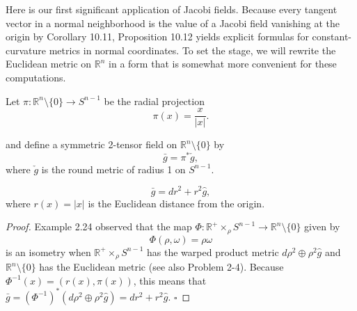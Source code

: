 Here is our first significant application of Jacobi fields. Because every tangent vector in a normal neighborhood is the value of a Jacobi field vanishing at the origin by Corollary 10.11, Proposition 10.12 yields explicit formulas for constant-curvature metrics in normal coordinates. To set the stage, we will rewrite the Euclidean metric on $\mathbb{R}^n$ in a form that is somewhat more convenient for these computations.

Let $\pi : \mathbb{R}^n \setminus \{0\} \to S^{n-1}$ be the radial projection
\begin{equation}
\pi(x) = \frac{x}{|x|}.
\tag{10.13}
\end{equation}

and define a symmetric 2-tensor field on $\mathbb{R}^n \setminus \{0\}$ by
\[
\bar{g} = \pi^* \check{g},
\]
where $\check{g}$ is the round metric of radius 1 on $S^{n-1}$.

\begin{lemma}\label{lem:metric-relation-euclidean}
\[
\bar{g} = dr^2 + r^2 \hat{g},
\]
where $r(x) = |x|$ is the Euclidean distance from the origin.

\begin{proof}
Example 2.24 observed that the map $\Phi : \mathbb{R}^+ \times_\rho S^{n-1} \to \mathbb{R}^n \setminus \{0\}$ given by
\[
\Phi(\rho,\omega) = \rho\omega
\]
is an isometry when $\mathbb{R}^+ \times_\rho S^{n-1}$ has the warped product metric $d\rho^2 \oplus \rho^2 \hat{g}$ and $\mathbb{R}^n \setminus \{0\}$ has the Euclidean metric (see also Problem 2-4). Because $\Phi^{-1}(x) = (r(x), \pi(x))$, this means that $\bar{g} = (\Phi^{-1})^*(d\rho^2 \oplus \rho^2 \hat{g}) = dr^2 + r^2 \hat{g}$. \quad$\square$
\end{proof}
\end{lemma}

